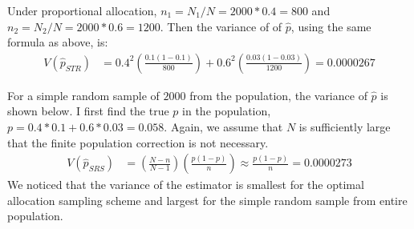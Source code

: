 \documentclass[12pt]{article}\usepackage[]{graphicx}\usepackage[]{color}
\begin{document}
\begin{doublespacing}
\begin{enumerate}
\begin{enumerate}
Under proportional allocation, $n_1=N_1/N=2000*0.4=800$ and $n_2=N_2/N=2000*0.6=1200$. Then the variance of of $\hat{p}$, using the same formula as above, is:
\begin{align*}
V(\hat{p}_{STR}) &= 0.4^2 \left(\frac{0.1(1-0.1)}{800}\right)+0.6^2 \left(\frac{0.03(1-0.03)}{1200}\right) = 0.0000267
\end{align*}

For a simple random sample of $2000$ from the population, the variance of $\hat{p}$ is shown below. I first find the true $p$ in the population, $p=0.4*0.1+0.6*0.03 = 0.058$. Again, we assume that $N$ is sufficiently large that the finite population correction is not necessary.
\begin{align*}
V(\hat{p}_{SRS}) &= \left(\frac{N-n}{N-1}\right)\left(\frac{p(1-p)}{n}\right)
\approx \frac{p(1-p)}{n} = 0.0000273
\end{align*}
We noticed that the variance of the estimator is smallest for the optimal allocation sampling scheme and largest for the simple random sample from entire population.

\end{enumerate}


\end{enumerate}

\end{doublespacing}
\end{document}
